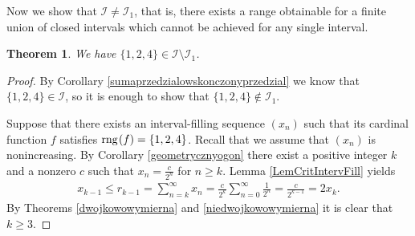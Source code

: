 \documentclass{amsart}
\newtheorem{theorem}{Theorem}[section]
\newtheorem{corollary}[theorem]{Corollary}
\theoremstyle{definition}
\newcommand{\rng}{{\rm rng} \hspace{0.03cm}}
\begin{document}


Now we show that $\mathcal{I}\neq \mathcal{I}_1$, that is, there exists a range obtainable for a finite union of closed intervals which cannot be achieved for any single interval.


\begin{theorem}\label{sumaprzedzialowalenieprzedzial}
We have $\{1,2,4\}\in \mathcal{I}\setminus \mathcal{I}_1$.
\end{theorem}
\begin{proof}
By Corollary \ref{sumaprzedzialowskonczonyprzedzial} we know that $\{1,2,4\}\in \mathcal{I}$, so it is enough to show that $\{1,2,4\}\notin \mathcal{I}_1$.

Suppose that there exists an interval-filling sequence $(x_n)$ such that its cardinal function $f$ satisfies $\rng (f)=\{1,2,4\}$. Recall that we assume that $(x_{n})$ is nonincreasing. By Corollary \ref{geometrycznyogon} there exist a positive integer $k$ and a nonzero $c$ such that $x_n=\frac{c}{2^n}$ for $n\geq k$. Lemma \ref{LemCritIntervFill} yields
\begin{align*}
x_{k-1}\leq r_{k-1}=\sum_{n=k}^{\infty} x_{n} = \frac{c}{2^{k}} \sum_{n=0}^{\infty} \frac{1}{2^{n}} = \frac{c}{2^{k-1}} =2x_{k}.
\end{align*}
By Theorems \ref{dwojkowowymierna} and \ref{niedwojkowowymierna} it is clear that $k\geq 3$.


\end{proof}
\end{document}

